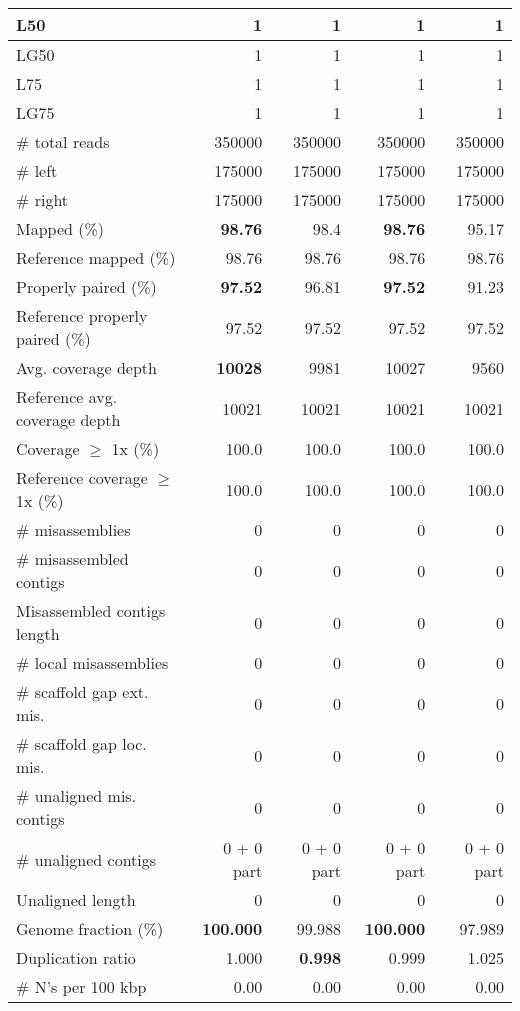 \documentclass[12pt,a4paper]{article}
\begin{document}
\begin{table}[ht]
\begin{center}
\begin{tabular}{|l*{4}{|r}|}
L50 & 1 & 1 & 1 & 1 \\ \hline
LG50 & 1 & 1 & 1 & 1 \\ \hline
L75 & 1 & 1 & 1 & 1 \\ \hline
LG75 & 1 & 1 & 1 & 1 \\ \hline
\# total reads & 350000 & 350000 & 350000 & 350000 \\ \hline
\# left & 175000 & 175000 & 175000 & 175000 \\ \hline
\# right & 175000 & 175000 & 175000 & 175000 \\ \hline
Mapped (\%) & {\bf 98.76} & 98.4 & {\bf 98.76} & 95.17 \\ \hline
Reference mapped (\%) & 98.76 & 98.76 & 98.76 & 98.76 \\ \hline
Properly paired (\%) & {\bf 97.52} & 96.81 & {\bf 97.52} & 91.23 \\ \hline
Reference properly paired (\%) & 97.52 & 97.52 & 97.52 & 97.52 \\ \hline
Avg. coverage depth & {\bf 10028} & 9981 & 10027 & 9560 \\ \hline
Reference avg. coverage depth & 10021 & 10021 & 10021 & 10021 \\ \hline
Coverage $\geq$ 1x (\%) & 100.0 & 100.0 & 100.0 & 100.0 \\ \hline
Reference coverage $\geq$ 1x (\%) & 100.0 & 100.0 & 100.0 & 100.0 \\ \hline
\# misassemblies & 0 & 0 & 0 & 0 \\ \hline
\# misassembled contigs & 0 & 0 & 0 & 0 \\ \hline
Misassembled contigs length & 0 & 0 & 0 & 0 \\ \hline
\# local misassemblies & 0 & 0 & 0 & 0 \\ \hline
\# scaffold gap ext. mis. & 0 & 0 & 0 & 0 \\ \hline
\# scaffold gap loc. mis. & 0 & 0 & 0 & 0 \\ \hline
\# unaligned mis. contigs & 0 & 0 & 0 & 0 \\ \hline
\# unaligned contigs & 0 + 0 part & 0 + 0 part & 0 + 0 part & 0 + 0 part \\ \hline
Unaligned length & 0 & 0 & 0 & 0 \\ \hline
Genome fraction (\%) & {\bf 100.000} & 99.988 & {\bf 100.000} & 97.989 \\ \hline
Duplication ratio & 1.000 & {\bf 0.998} & 0.999 & 1.025 \\ \hline
\# N's per 100 kbp & 0.00 & 0.00 & 0.00 & 0.00 \\ \hline

\end{tabular}
\end{center}
\end{table}
\end{document}
